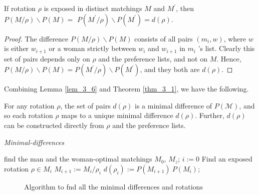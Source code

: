 \begin{lemma}\label{lem_3_6}
    If rotation $\rho$ is exposed in distinct matchings $M$ and $M^{\prime}$, then $P(M / \rho) \backslash P(M)=$ $P\left(M^{\prime} / \rho\right) \backslash P\left(M^{\prime}\right)=d(\rho)$.
\end{lemma}

\begin{proof}
    The difference $P(M / \rho) \backslash P(M)$ consists of all pairs $\left(m_i, w\right)$, where $w$ is either $w_{i+1}$ or a woman strictly between $w_i$ and $w_{i+1}$ in $m_i$ 's list. Clearly this set of pairs depends only on $\rho$ and the preference lists, and not on $M$. Hence, $P(M / \rho) \backslash P(M)=P\left(M^{\prime} / \rho\right) \backslash P\left(M^{\prime}\right)$, and they both are $d(\rho)$.
\end{proof}

Combining Lemma \ref{lem_3_6} and Theorem \ref{thm_3_1}, we have the following.

\begin{theorem}\label{thm_3_2}
    For any rotation $\rho$, the set of pairs $d(\rho)$ is a minimal difference of $P(\mathcal{M})$, and so each rotation $\rho$ maps to a unique minimal difference $d(\rho)$. Further, $d(\rho)$ can be constructed directly from $\rho$ and the preference lists.
\end{theorem}

\begin{center}
\begin{minipage}{.8\linewidth}
\begin{algorithm}[H]
\caption{\textit{Minimal-differences}}
\begin{algorithmic}[1]
\State find the man and the woman-optimal matchings $M_0$, $M_z$;
\State $i:= 0$
\State Find an exposed rotation $\rho \in M_{i}$
\State $M_{i+1} := M_i/\rho_i$
\State $d(\rho_i) := P(M_{i+1}) \ P(M_i)$;
\EndWhile
\end{algorithmic}
\end{algorithm}
\end{minipage}

\begin{figure}[ht]
  \centering
  \caption{Algorithm to fnd all the minimal differences and rotations}
  \label{FIG_3_4}
\end{figure}
\end{center}


